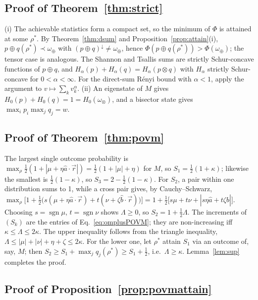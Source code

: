 \documentclass[11pt]{article}
\theoremstyle{definition}
\newcommand{\vecr}{\vec r}
\newcommand{\maj}{\prec}
\newcommand{\omplus}{\omega_{\oplus}}
\newcommand{\omtimes}{\omega_{\otimes}}
\begin{document}
\subsection*{Proof of Theorem~\ref{thm:strict}}

(i) The achievable statistics form a compact set, so the minimum of $\Phi$ is
attained at some $\rho^*$. By Theorem~\ref{thm:dsum} and
Proposition~\ref{prop:attain}(i), $p\oplus q(\rho^*)\maj\omplus$ with
$(p\oplus q)^\downarrow\ne\omplus$, hence $\Phi(p\oplus q(\rho^*))>\Phi(\omplus)$; the tensor case
is analogous. The Shannon and Tsallis sums are strictly Schur-concave functions
of $p\oplus q$, and $H_\alpha(p)+H_\alpha(q)=H_\alpha(p\otimes q)$ with $H_\alpha$ strictly
Schur-concave for $0<\alpha<\infty$. For the direct-sum R\'enyi bound with $\alpha<1$,
apply the argument to $v\mapsto\sum_kv_k^\alpha$. (ii) An eigenstate of $M$ gives
$H_0(p)+H_0(q)=1=H_0(\omtimes)$, and a bisector state gives $\max_ip_i\max_jq_j=w$.

\subsection*{Proof of Theorem~\ref{thm:povm}}

The largest single outcome probability is
$\max_\rho\frac12(1+|\mu+\eta\hat a\cdot\vecr|)=\frac12(1+|\mu|+\eta)$ for $M$, so
$S_1=\frac12(1+\kappa)$; likewise the smallest is $\frac12(1-\kappa)$, so
$S_3=2-\frac12(1-\kappa)$. For $S_2$, a pair within one distribution sums to 1,
while a cross pair gives, by Cauchy--Schwarz,
$\max_\rho\bigl[1+\frac12\bigl(s(\mu+\eta\hat a\cdot\vecr)+t(\nu+\zeta\hat b\cdot\vecr)\bigr)\bigr]
=1+\frac12\bigl[s\mu+t\nu+|s\eta\hat a+t\zeta\hat b|\bigr]$. Choosing $s=\operatorname{sgn}\mu$,
$t=\operatorname{sgn}\nu$ shows $\Lambda\ge0$, so $S_2=1+\frac12\Lambda$. The increments of $(S_k)$ are
the entries of Eq.~\eqref{eq:omplusPOVM}; they are non-increasing iff
$\kappa\le\Lambda\le2\kappa$. The upper inequality follows from the triangle inequality,
$\Lambda\le|\mu|+|\nu|+\eta+\zeta\le2\kappa$. For the lower one, let $\rho^*$ attain $S_1$ via
an outcome of, say, $M$; then $S_2\ge S_1+\max_jq_j(\rho^*)\ge S_1+\frac12$, i.e.\
$\Lambda\ge\kappa$. Lemma~\ref{lem:sup} completes the proof.

\subsection*{Proof of Proposition~\ref{prop:povmattain}}
\end{document}
